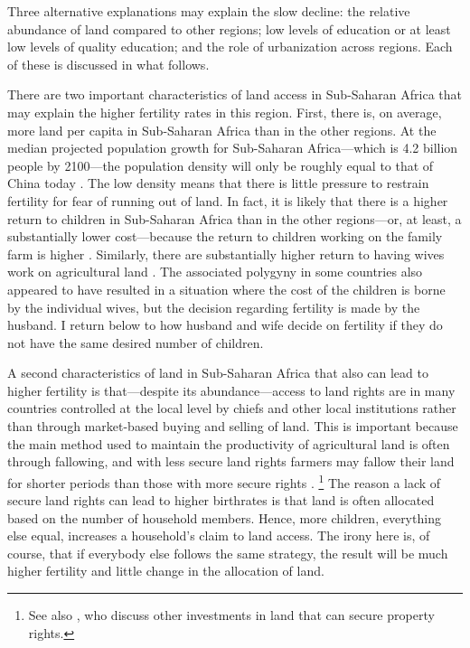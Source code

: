 \documentclass[letterpaper,12pt]{article}
\begin{document}
Three alternative explanations may explain the slow decline: the
relative abundance of land compared to other regions; low levels of
education or at least low levels of quality education; and the role of
urbanization across regions. 
Each of these is discussed in what follows.

There are two important characteristics of land access in Sub-Saharan
Africa that may explain the higher fertility rates in this region. 
First, there is, on average, more land per capita in Sub-Saharan Africa
than in the other regions. 
At the median projected population growth for Sub-Saharan Africa---which
is 4.2 billion people by 2100---the population density will only be
roughly equal to that of China today \citep[p 235]{Gerland2014}. 
The low density means that there is little pressure to restrain
fertility for fear of running out of land. 
In fact, it is likely that there is a higher return to children in
Sub-Saharan Africa than in the other regions---or, at least, a
substantially lower cost---because the return to children working on the
family farm is higher \citep{Caldwell1992,Bongaarts2013a}. 
Similarly, there are substantially higher return to having wives work on
agricultural land \citep{jacoby95,Matz2016}. 
The associated polygyny in some countries also appeared to have resulted
in a situation where the cost of the children is borne by the individual
wives, but the decision regarding fertility is made by the husband. 
I return below to how husband and wife decide on fertility if they do
not have the same desired number of children.

A second characteristics of land in Sub-Saharan Africa that also can
lead to higher fertility is that---despite its abundance---access to
land rights are in many countries controlled at the local level by
chiefs and other local institutions rather than through market-based
buying and selling of land. 
This is important because the main method used to maintain the
productivity of agricultural land is often through fallowing, and with
less secure land rights farmers may fallow their land for shorter
periods than those with more secure rights \citep{Goldstein2008}.%
\footnote{
See also \citet{besley95c}, who discuss other investments in land that
can secure property rights.} 
The reason a lack of secure land rights can lead to higher birthrates is
that land is often allocated based on the number of household members. 
Hence, more children, everything else equal, increases a household's
claim to land access. 
The irony here is, of course, that if everybody else follows the same
strategy, the result will be much higher fertility and little change in
the allocation of land.
\end{document}
